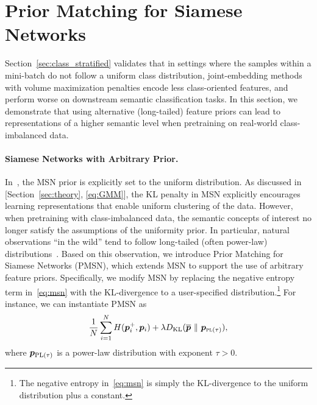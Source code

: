\documentclass{article} %
\begin{document}
\section{Prior Matching for Siamese Networks}
\label{sec:priors}

Section~\ref{sec:class_stratified} validates that in settings where the samples within a mini-batch do not follow a uniform class distribution, joint-embedding methods with volume maximization penalties encode less class-oriented features, and perform  worse on downstream semantic classification tasks.
In this section, we demonstrate that using alternative (long-tailed) feature priors can lead to representations of a higher semantic level when pretraining on real-world class-imbalanced data.

\paragraph{Siamese Networks with Arbitrary Prior.}
In~\citet{assran2022masked}, the MSN prior is explicitly set to the uniform distribution.
As discussed in [Section~\ref{sec:theory}, \eqref{eq:GMM}], the KL penalty in MSN explicitly encourages learning representations that enable uniform clustering of the data.
However, when pretraining with class-imbalanced data, the semantic concepts of interest no longer satisfy the assumptions of the uniformity prior.
In particular, natural observations ``in the wild'' tend to follow long-tailed (often power-law) distributions~\citep{newman2005power, mahajan2018exploring, van2018inaturalist}.
Based on this observation, we introduce Prior Matching for Siamese Networks (PMSN), which extends MSN to support the use of arbitrary feature priors.
Specifically, we modify MSN by replacing the negative entropy term in~\eqref{eq:msn} with the KL-divergence to a user-specified distribution.\footnote{The negative entropy in~\eqref{eq:msn} is simply the KL-divergence to the uniform distribution plus a constant.}
For instance, we can instantiate PMSN as
 \begin{equation}
     \label{eq:msn_prior}
     \frac{1}{N} \sum^N_{i=1} H({\bm{p}}_{i}^+, {\bm{p}}_i) + \lambda D_{\text{KL}}( \overline{{\bm{p}}}\ \lVert\ {\bm{p}}_{\text{\sc pl}(\tau)}),
 \end{equation}
where ${\bm{p}}_{\text{PL}(\tau)}$ is a power-law distribution with exponent $\tau > 0$.
\end{document}
